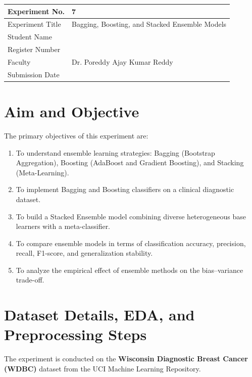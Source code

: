 \documentclass[12pt,a4paper]{article}
\begin{document}
\begin{tabular}{|p{4cm}|p{11.5cm}|}
\hline
Experiment No. & 7 \\ \hline
Experiment Title & Bagging, Boosting, and Stacked Ensemble Models \\ \hline
Student Name & \\ \hline
Register Number & \\ \hline
Faculty & Dr. Poreddy Ajay Kumar Reddy \\ \hline
Submission Date & \\ \hline
\end{tabular}

\vspace{0.5cm}

\section{Aim and Objective}
The primary objectives of this experiment are:
\begin{enumerate}[label=\alph*)]
\item To understand ensemble learning strategies: Bagging (Bootstrap Aggregation), Boosting (AdaBoost and Gradient Boosting), and Stacking (Meta-Learning).
\item To implement Bagging and Boosting classifiers on a clinical diagnostic dataset.
\item To build a Stacked Ensemble model combining diverse heterogeneous base learners with a meta-classifier.
\item To compare ensemble models in terms of classification accuracy, precision, recall, F1-score, and generalization stability.
\item To analyze the empirical effect of ensemble methods on the bias--variance trade-off.
\end{enumerate}

\section{Dataset Details, EDA, and Preprocessing Steps}
The experiment is conducted on the \textbf{Wisconsin Diagnostic Breast Cancer (WDBC)} dataset from the UCI Machine Learning Repository.
\end{document}

